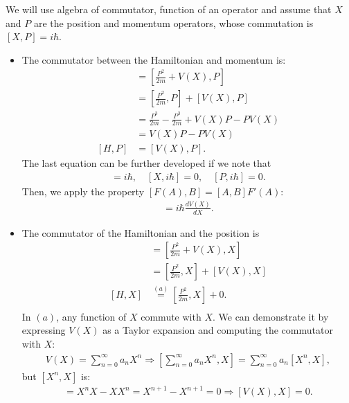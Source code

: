 \documentclass[letterpaper,11pt,twoside]{article}
\begin{document}
\begin{enumerate}[itemsep=0pt,topsep=0pt,label=\alph*.]
\begin{enumerate}[itemsep=0pt,topsep=0pt]
    We will use algebra of commutator, function of an operator and assume that $X$ and $P$ are the position and momentum operators, whose commutation is $[X,P]=i\hbar$.
    \begin{itemize}[itemsep=0pt,topsep=0pt]
      \item The commutator between the Hamiltonian and momentum is:
      \begin{align*}
        [H,P]&=\left[\frac{P^2}{2m}+V(X),P\right]\\
        &=\left[\frac{P^2}{2m},P\right]+[V(X),P]\\
        &=\frac{P^3}{2m}-\frac{P^3}{2m}+V(X)P-PV(X)\\
        &=V(X)P-PV(X)\\
        [H,P]&=[V(X),P].
      \end{align*}
      The last equation can be further developed if we note that
      \begin{align*}
        [X,P]=i\hbar,\quad[X,i\hbar]=0,\quad[P,i\hbar]=0.
      \end{align*}
      Then, we apply the property $[F(A),B]=[A,B]F'(A)$:
      \begin{align}
        [H,P]=i\hbar\frac{dV(X)}{dX}.
        \label{eq:commutatorHP}
      \end{align}
      \item The commutator of the Hamiltonian and the position is
      \begin{align*}
        [H,X]&=\left[\frac{P^2}{2m}+V(X),X\right]\\
        &=\left[\frac{P^2}{2m},X\right]+[V(X),X]\\
        [H,X]&\stackrel{(a)}{=}\left[\frac{P^2}{2m},X\right]+0.\\
      \end{align*}
      In $(a)$, any function of $X$ commute with $X$. We can demonstrate it by expressing $V(X)$ as a Taylor expansion and computing the commutator with $X$:
      \begin{align*}
        V(X)=\sum_{n=0}^\infty a_nX^n\Longrightarrow\left[\sum_{n=0}^\infty a_nX^n,X\right]=\sum_{n=0}^\infty a_n[X^n,X],
      \end{align*}
      but $[X^n,X]$ is:
      \begin{align*}
        [X^n,X]=X^nX-XX^n=X^{n+1}-X^{n+1}=0\Longrightarrow[V(X),X]=0.
      \end{align*}


\end{itemize}
\end{enumerate}
\end{enumerate}
\end{document}
